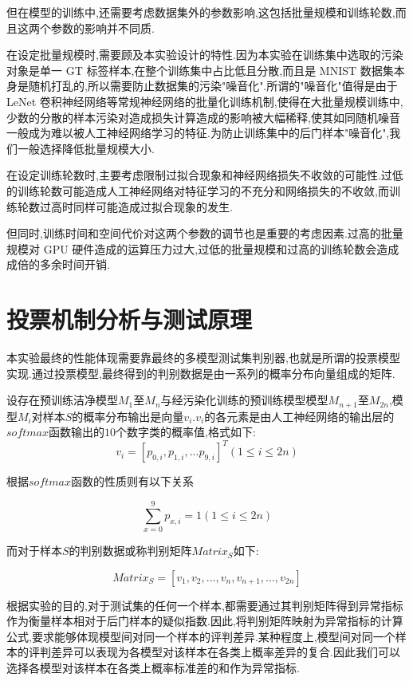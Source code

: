 但在模型的训练中,还需要考虑数据集外的参数影响,这包括批量规模和训练轮数,而且这两个参数的影响并不同质.

在设定批量规模时,需要顾及本实验设计的特性.因为本实验在训练集中选取的污染对象是单一 GT 标签样本,在整个训练集中占比低且分散,而且是 MNIST 数据集本身是随机打乱的,所以需要防止数据集的污染"噪音化".所谓的"噪音化"值得是由于 LeNet 卷积神经网络等常规神经网络的批量化训练机制,使得在大批量规模训练中,少数的分散的样本污染对造成损失计算造成的影响被大幅稀释,使其如同随机噪音一般成为难以被人工神经网络学习的特征.为防止训练集中的后门样本"噪音化",我们一般选择降低批量规模大小.

在设定训练轮数时,主要考虑限制过拟合现象和神经网络损失不收敛的可能性.过低的训练轮数可能造成人工神经网络对特征学习的不充分和网络损失的不收敛,而训练轮数过高时同样可能造成过拟合现象的发生.

但同时,训练时间和空间代价对这两个参数的调节也是重要的考虑因素.过高的批量规模对 GPU 硬件造成的运算压力过大,过低的批量规模和过高的训练轮数会造成成倍的多余时间开销.

\section{投票机制分析与测试原理}
本实验最终的性能体现需要靠最终的多模型测试集判别器,也就是所谓的投票模型实现.通过投票模型,最终得到的判别数据是由一系列的概率分布向量组成的矩阵.

设存在预训练洁净模型$M_1$至$M_n$与经污染化训练的预训练模型模型$M_{n+1}$至$M_{2n}$,模型$M_i$对样本$S$的概率分布输出是向量${v_i}$.$v_i$的各元素是由人工神经网络的输出层的$softmax$函数输出的$10$个数字类的概率值,格式如下:
\begin{equation}
v_i=[p_{0,i},p_{1,i},...p_{9,i}]^{T} (1 \leq i \leq 2n) 
\end{equation}

根据$softmax$函数的性质则有以下关系

\begin{equation}
\sum_{x=0}^{9} p_{x,i} = 1 (1 \leq i \leq 2n) 
\end{equation}

而对于样本$S$的判别数据或称判别矩阵$Matrix_{S}$如下:

\begin{equation}
Matrix_{S} = [v_1,v_2,...,v_n,v_{n+1},...,v_{2n}] 
\end{equation}

根据实验的目的,对于测试集的任何一个样本,都需要通过其判别矩阵得到异常指标作为衡量样本相对于后门样本的疑似指数.因此,将判别矩阵映射为异常指标的计算公式,要求能够体现模型间对同一个样本的评判差异.某种程度上,模型间对同一个样本的评判差异可以表现为各模型对该样本在各类上概率差异的复合.因此我们可以选择各模型对该样本在各类上概率标准差的和作为异常指标.

